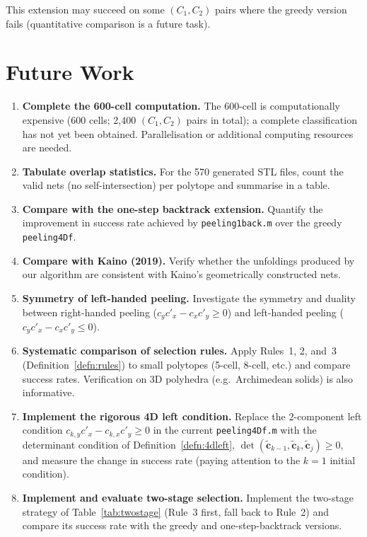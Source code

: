 \documentclass[12pt,a4paper]{article}
\theoremstyle{definition}
\begin{document}
This extension may succeed on some $(C_1, C_2)$ pairs where the greedy
version fails (quantitative comparison is a future task).


\section{Future Work}
\label{sec:future}

\begin{enumerate}
  \item \textbf{Complete the 600-cell computation.}
        The 600-cell is computationally expensive (600 cells;
        2,400 $(C_1,C_2)$ pairs in total);
        a complete classification has not yet been obtained.
        Parallelisation or additional computing resources are needed.

  \item \textbf{Tabulate overlap statistics.}
        For the 570 generated STL files, count the valid nets
        (no self-intersection) per polytope and summarise in a table.

  \item \textbf{Compare with the one-step backtrack extension.}
        Quantify the improvement in success rate achieved by
        \texttt{peeling1back.m} over the greedy \texttt{peeling4Df}.

  \item \textbf{Compare with Kaino (2019).}
        Verify whether the unfoldings produced by our algorithm are
        consistent with Kaino's geometrically constructed nets.

  \item \textbf{Symmetry of left-handed peeling.}
        Investigate the symmetry and duality between right-handed peeling
        ($c_y c'_x - c_x c'_y \geq 0$) and left-handed peeling
        ($c_y c'_x - c_x c'_y \leq 0$).

  \item \textbf{Systematic comparison of selection rules.}
        Apply Rules~1, 2, and~3 (Definition~\ref{defn:rules}) to small
        polytopes (5-cell, 8-cell, etc.) and compare success rates.
        Verification on 3D polyhedra (e.g.\ Archimedean solids) is also
        informative.

  \item \textbf{Implement the rigorous 4D left condition.}
        Replace the 2-component left condition
        $c_{k,y}c'_x - c_{k,x}c'_y \ge 0$ in the current
        \texttt{peeling4Df.m} with the determinant condition of
        Definition~\ref{defn:4dleft},
        $\det(\tilde{\mathbf{c}}_{k-1}, \tilde{\mathbf{c}}_k, \tilde{\mathbf{c}}_j) \ge 0$,
        and measure the change in success rate
        (paying attention to the $k=1$ initial condition).

  \item \textbf{Implement and evaluate two-stage selection.}
        Implement the two-stage strategy of Table~\ref{tab:twostage}
        (Rule~3 first, fall back to Rule~2) and compare its success rate
        with the greedy and one-step-backtrack versions.
\end{enumerate}
\end{document}
